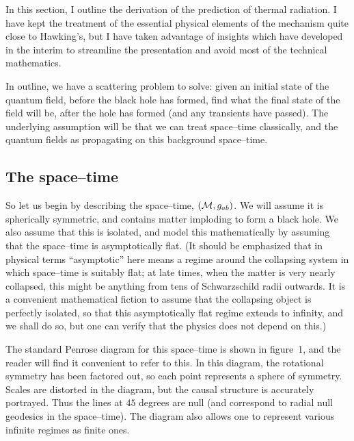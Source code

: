 In this section, I outline the derivation of the prediction of thermal
radiation.  I have kept the treatment of the essential physical elements of the
mechanism quite close to Hawking's, but I have taken advantage of insights
which have developed in the interim to streamline the presentation and avoid
most of the technical mathematics.

In outline, we have a scattering problem to solve:  given an initial
state of the quantum field, before the black hole has formed, find
what the final state of the field will be, after the hole has formed
(and any transients have passed).  The underlying assumption will be
that we can treat space--time classically, and the quantum fields as
propagating on this background space--time. 

\subsection{The space--time}

So let us begin by describing the space--time, $({\cal M}, g_{ab})$.
We will assume it is spherically symmetric, and contains matter
imploding to form a black hole.  We also assume that this is isolated,
and model this mathematically by assuming that the space--time is
asymptotically flat.  (It should be emphasized that in physical terms
``asymptotic'' here means a regime around the collapsing system in
which space--time is suitably flat; at late times, when the matter is
very nearly collapsed, this might be anything from tens of
Schwarzschild radii outwards.  It is a convenient mathematical fiction
to assume that the collapsing object is perfectly isolated, so that
this asymptotically flat regime extends to infinity, and we shall do
so, but one can verify that the physics does not depend on this.)

\epsfysize=3in

The standard Penrose diagram for this space--time is shown in
figure~1, and the reader will find it convenient to refer to this.  In
this diagram, the rotational symmetry has been factored out, so each
point represents a sphere of symmetry.  Scales are distorted in the
diagram, but the causal structure is accurately portrayed.  Thus the
lines at $45$ degrees are null (and correspond to radial null geodesics
in the space--time).  The diagram also allows one to represent various
infinite regimes as finite ones. 

